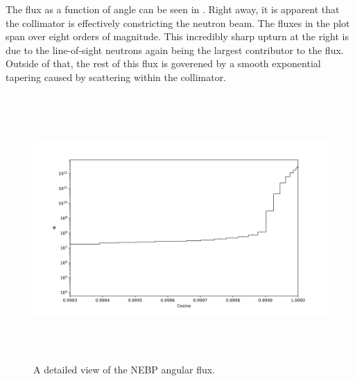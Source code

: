 The flux as a function of angle can be seen in .
Right away, it is apparent that the collimator is effectively constricting the neutron beam.
The fluxes in the plot span over eight orders of magnitude.
This incredibly sharp upturn at the right is due to the line-of-sight neutrons again being the largest contributor to the flux.
Outside of that, the rest of this flux is goverened by a smooth exponential tapering caused by scattering within the collimator.


%
\begin{figure}[htb]
\centering
\includegraphics[height=4in]{tex/figures/flux_cos_detail.png}
\caption[Detailed Flux vs. Angle]{A detailed view of the NEBP angular flux.}
\label{fig:flux_cos_detail}
\end{figure}

